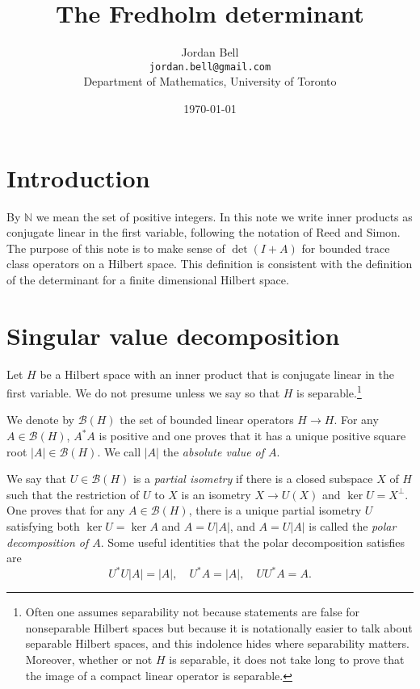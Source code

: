\documentclass{article}
\theoremstyle{definition}
\begin{document}
\title{The Fredholm determinant}
\author{Jordan Bell\\ \texttt{jordan.bell@gmail.com}\\Department of Mathematics, University of Toronto}
\date{\today}

\maketitle

\section{Introduction}
By $\mathbb{N}$ we mean the set of positive integers. In this note we write inner products as conjugate linear in the first variable, following the notation of Reed and Simon.
The purpose of this note is to make sense of $\det(I+A)$ for bounded trace class operators on a Hilbert space. This definition is consistent with the definition of the determinant for
a finite dimensional Hilbert space.


\section{Singular value decomposition}
Let $H$ be a Hilbert space with an inner product that is conjugate linear in the first variable. We do not presume unless we say
so that $H$ is separable.\footnote{Often one assumes separability not because statements are false
for nonseparable Hilbert spaces but because it is notationally easier to talk about separable Hilbert spaces, and this
indolence hides where separability matters. Moreover, whether or not $H$ is separable, it does not take long to prove that the image
of a compact linear operator is separable.}

We denote by $\mathscr{B}(H)$ the set of bounded linear operators $H \to H$.
For any $A \in \mathscr{B}(H)$, $A^*A$ is positive and one proves that it has a unique positive square root $|A| \in \mathscr{B}(H)$. 
We call $|A|$ the {\em absolute value of $A$}.

We say that $U \in \mathscr{B}(H)$ is a {\em partial isometry} if there is a closed subspace $X$ of $H$ such that the restriction
of $U$ to $X$ is an isometry $X \to U(X)$ and $\ker U = X^\perp$. One proves that for any $A \in \mathscr{B}(H)$, there is a unique partial
isometry $U$ satisfying both $\ker U=\ker A$ and $A=U|A|$, and $A=U|A|$ is called the {\em polar decomposition of $A$}. Some useful identities that
the polar decomposition satisfies are
\[
U^*U|A|=|A|, \quad U^*A=|A|, \quad UU^*A=A.
\]
\end{document}
